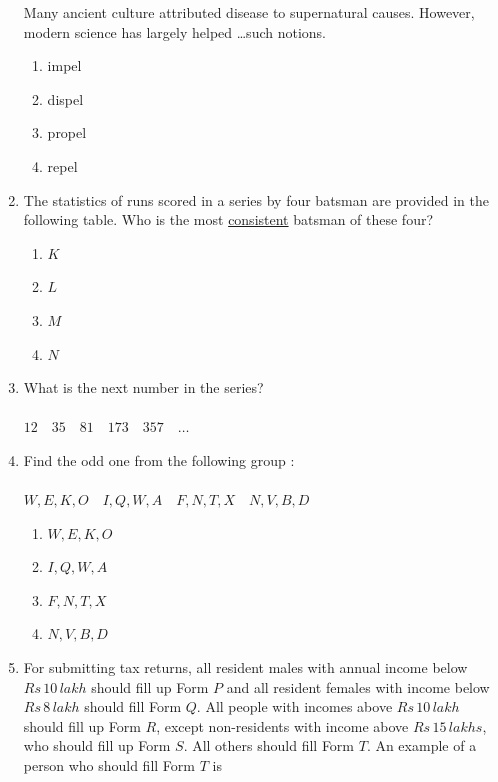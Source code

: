 \documentclass[journal]{IEEEtran}
\begin{document}
\begin{enumerate}
    Many ancient culture attributed disease to supernatural causes. However, modern science has largely helped \dots such notions.
    \begin{enumerate}
        \item impel
        \item dispel
        \item propel
        \item repel
    \end{enumerate}
    \item The statistics of runs scored in a series by four batsman are provided in the following table. Who is the most \underline{consistent} batsman of these four?
	
    \begin{table}[h!]    
  \centering
  
  \label{tab1.1.9.2}
\end{table}
    \begin{enumerate}
        \item $K$
        \item $L$
        \item $M$
        \item $N$
    \end{enumerate}
    \item What is the next number in the series?\\ \\
        $12\quad 35\quad81\quad173\quad357\quad\dots$
    \item Find the odd one from the following group $\colon$ \\ \\
        $W,E,K,O\quad I,Q,W,A\quad F,N,T,X\quad N,V,B,D$
     \begin{enumerate}
        \item $W,E,K,O$
        \item $I,Q,W,A$
        \item $F,N,T,X$
        \item $N,V,B,D$
    \end{enumerate}
    \item For submitting tax returns, all resident males with annual income below $Rs\,10\,lakh$ should fill up Form $P$ and all resident females with income below $Rs\,8\,lakh$ should fill Form $Q$. All people with incomes above $Rs\,10\,lakh$ should fill up Form $R$, except non-residents with income above $Rs\,15\,lakhs$, who should fill up Form $S$. All others should fill Form $T$. An example of a person who should fill Form $T$ is 

\end{enumerate}
\end{document}
